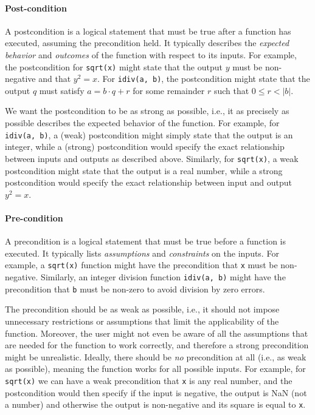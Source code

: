 \documentclass[oneside,11pt,dvipsnames]{book}
\numberwithin{equation}{section}
\theoremstyle{definition}
\theoremstyle{remark}
\newcommand{\code}[1]{\texttt{#1}}
\begin{document}
\paragraph{Post-condition} A postcondition is a logical statement that must be true after a function has executed, assuming the precondition held. It typically describes the \emph{expected behavior} and \emph{outcomes} of the function with respect to its inputs. For example, the postcondition for \code{sqrt(x)} might state that the output $y$ must be non-negative and that $y^2 = x$. For \code{idiv(a, b)}, the postcondition might state that the output $q$ must satisfy $a = b \cdot q + r$ for some remainder $r$ such that $0 \leq r < |b|$.

We want the postcondition to be as strong as possible, i.e., it as precisely as possible describes the expected behavior of the function. For example, for \code{idiv(a, b)}, a (weak) postcondition might simply state that the output is an integer, while a (strong) postcondition would specify the exact relationship between inputs and outputs as described above. Similarly, for \code{sqrt(x)}, a weak postcondition might state that the output is a real number, while a strong postcondition would specify the exact relationship between input and output $y^2 = x$.


\paragraph{Pre-condition} A precondition is a logical statement that must be true before a function is executed. It typically lists \emph{assumptions} and \emph{constraints} on the inputs. For example, a \code{sqrt(x)} function might have the precondition that \code{x} must be non-negative. Similarly, an integer division function \code{idiv(a, b)} might have the precondition that \code{b} must be non-zero to avoid division by zero errors.

The precondition should be as weak as possible, i.e., it should not impose unnecessary restrictions or assumptions that limit the applicability of the function. Moreover, the user might not even be aware of all the assumptions that are needed for the function to work correctly, and therefore a strong precondition might be unrealistic. Ideally, there should be \emph{no} precondition at all (i.e., as weak as possible), meaning the function works for all possible inputs.
For example, for \code{sqrt(x)} we can have a weak precondition that \code{x} is any real number, and the postcondition would then specify if the input is negative, the output is NaN (not a number) and otherwise the output is non-negative and its square is equal to \code{x}.
\end{document}
